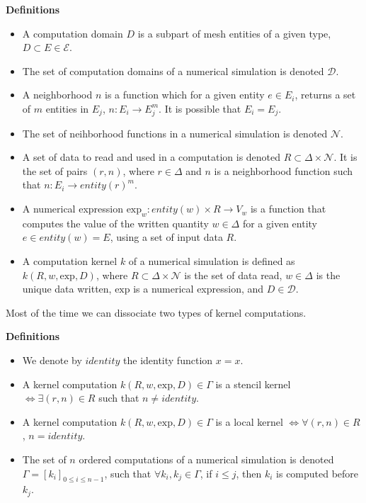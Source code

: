 \noindent \textbf{Definitions}
\begin{itemize}
\item A computation domain $D$ is a subpart of mesh entities of a given type, $D \subset E \in \mathcal{E}$.
\item The set of computation domains of a numerical simulation is denoted $\mathcal{D}$.
\item A neighborhood $n$ is a function which for a given entity $e \in E_i$, returns a set of $m$ entities in $E_j$, $n : E_i \rightarrow E_j^m$. It is possible that $E_i = E_j$.
\item The set of neihborhood functions in a numerical simulation is denoted $\mathcal{N}$.
\item A set of data to read and used in a computation is denoted $R \subset \Delta \times \mathcal{N}$. It is the set of pairs $(r,n)$, where $r \in \Delta$ and $n$ is a neighborhood function such that $n : E_i \rightarrow entity(r)^m$.
\item A numerical expression $\text{exp}_{w}: entity(w) \times R \rightarrow V_{w}$ is a function that computes the value of the written quantity $w \in \Delta$ for a given entity $e \in entity(w)=E$, using a set of input data $R$.
\item A computation kernel $k$ of a numerical simulation is defined as $k(R,w,\text{exp},D)$, where $R \subset \Delta \times \mathcal{N}$ is the set of data read, $w \in \Delta$ is the unique data written, $\text{exp}$ is a numerical expression, and $D \in \mathcal{D}$.
\end{itemize}

Most of the time we can dissociate two types of kernel computations.

\noindent \textbf{Definitions}
\begin{itemize}
\item We denote by $identity$ the identity function $x=x$.
\item A kernel computation $k(R,w,\text{exp},D) \in \Gamma$ is a stencil kernel $\iff \exists (r,n) \in R$ such that $n \neq identity$.
\item A kernel computation $k(R,w,\text{exp},D) \in \Gamma$ is a local kernel $\iff \forall (r,n) \in R$, $n = identity$.
\item The set of $n$ ordered computations of a numerical simulation is denoted $\Gamma = [k_i]_{0 \leq i \leq n-1}$, such that $\forall k_i,k_j \in \Gamma$, if $i \leq j$, then $k_i$ is computed before $k_j$.
\end{itemize}

